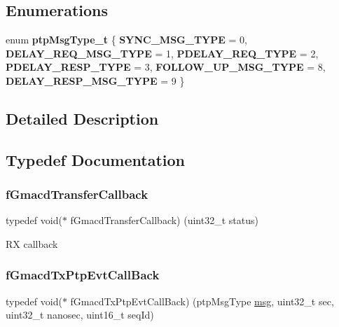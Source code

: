 \subsection*{Enumerations}
\begin{DoxyCompactItemize}
\item 
\mbox{\label{group__gmacd__types_ga5756d5c4257a0e079a6d832bc5f4cb08}} 
enum {\bfseries ptp\+Msg\+Type\+\_\+t} \{ \newline
{\bfseries S\+Y\+N\+C\+\_\+\+M\+S\+G\+\_\+\+T\+Y\+PE} = 0, 
{\bfseries D\+E\+L\+A\+Y\+\_\+\+R\+E\+Q\+\_\+\+M\+S\+G\+\_\+\+T\+Y\+PE} = 1, 
{\bfseries P\+D\+E\+L\+A\+Y\+\_\+\+R\+E\+Q\+\_\+\+T\+Y\+PE} = 2, 
{\bfseries P\+D\+E\+L\+A\+Y\+\_\+\+R\+E\+S\+P\+\_\+\+T\+Y\+PE} = 3, 
\newline
{\bfseries F\+O\+L\+L\+O\+W\+\_\+\+U\+P\+\_\+\+M\+S\+G\+\_\+\+T\+Y\+PE} = 8, 
{\bfseries D\+E\+L\+A\+Y\+\_\+\+R\+E\+S\+P\+\_\+\+M\+S\+G\+\_\+\+T\+Y\+PE} = 9
 \}
\end{DoxyCompactItemize}


\subsection{Detailed Description}


\subsection{Typedef Documentation}
\mbox{\label{group__gmacd__types_ga64979042bf43f697de166e864e3259de}} 
\subsubsection{\texorpdfstring{fGmacdTransferCallback}{fGmacdTransferCallback}}
{\footnotesize\ttfamily typedef void($\ast$ f\+Gmacd\+Transfer\+Callback) (uint32\+\_\+t status)}

RX callback \mbox{\label{group__gmacd__types_gad3329dfe65f5877f50ee8a4fd8e63f08}} 
\subsubsection{\texorpdfstring{fGmacdTxPtpEvtCallBack}{fGmacdTxPtpEvtCallBack}}
{\footnotesize\ttfamily typedef void($\ast$ f\+Gmacd\+Tx\+Ptp\+Evt\+Call\+Back) (ptp\+Msg\+Type \mbox{\hyperlink{structmsg}{msg}}, uint32\+\_\+t sec, uint32\+\_\+t nanosec, uint16\+\_\+t seq\+Id)}

